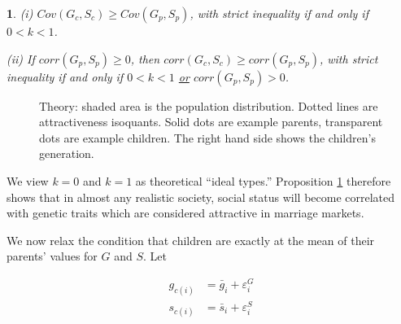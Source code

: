 \documentclass[
]{article}
\newtheorem{prop}{\protect\propositionname}
\providecommand{\propositionname}{Proposition}
\begin{document}
\begin{prop}
\label{prop:prop1}
(i) $Cov(G_{c}, S_{c}) \ge Cov(G_{p},S_{p})$, with strict inequality
if and only if $0 < k < 1$. 

(ii) If $corr(G_{p}, S_{p}) \ge 0$, then $corr(G_{c},S_{c}) \ge corr(G_{p},S_{p})$,
with strict inequality if and only if $0 < k < 1$ \uline{or} 
$corr(G_{p}, S_{p}) > 0$.
\end{prop}

\begin{figure}

{\centering {}\newline{}\newline{}

}

\caption{Theory: shaded area is the population distribution. Dotted lines are attractiveness isoquants. Solid dots are example parents, transparent dots are example children. The right hand side shows the children's generation.}\label{fig:pic-intuition}
\end{figure}

We view \(k = 0\) and \(k = 1\) as theoretical ``ideal types.'' Proposition
\ref{prop:prop1} therefore shows that in almost any realistic society,
social status will become correlated with genetic traits which are
considered attractive in marriage markets.

We now relax the condition that children are exactly at the mean of
their parents' values for \(G\) and \(S\). Let

\begin{align*}
g_{c(i)} & = \bar{g}_{i}+\varepsilon_{i}^{G} \\
s_{c(i)} & = \bar{s}_{i}+\varepsilon_{i}^{S}
\end{align*}
\end{document}
